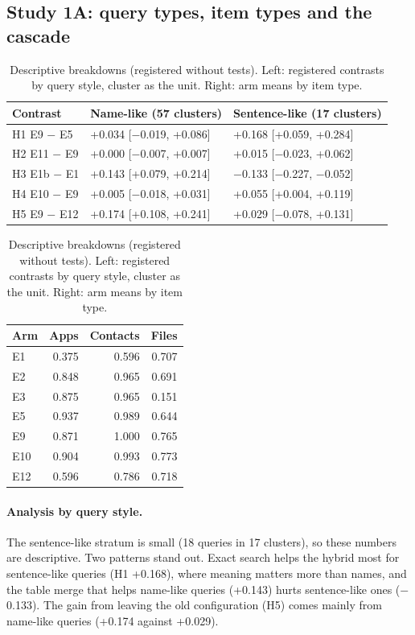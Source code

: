 \documentclass[pdflatex,sn-basic,Numbered]{sn-jnl}
\begin{document}
\subsection{Study 1A: query types, item types and the cascade}\label{sec:s1strata}

\begin{table}[tbp]
\centering\footnotesize\setlength{\tabcolsep}{3pt}
\caption{Descriptive breakdowns (registered without tests). Left: registered contrasts by query style, cluster as the unit. Right: arm means by item type.}
\label{tab:strata}
\begin{tabular}{lll}
\toprule
Contrast & Name-like (57 clusters) & Sentence-like (17 clusters) \\
\midrule
H1 E9 $-$ E5 & +0.034 [$-$0.019, +0.086] & +0.168 [+0.059, +0.284] \\
H2 E11 $-$ E9 & +0.000 [$-$0.007, +0.007] & +0.015 [$-$0.023, +0.062] \\
H3 E1b $-$ E1 & +0.143 [+0.079, +0.214] & $-$0.133 [$-$0.227, $-$0.052] \\
H4 E10 $-$ E9 & +0.005 [$-$0.018, +0.031] & +0.055 [+0.004, +0.119] \\
H5 E9 $-$ E12 & +0.174 [+0.108, +0.241] & +0.029 [$-$0.078, +0.131] \\
\bottomrule
\end{tabular}\hfill
\begin{tabular}{lrrr}
\toprule
Arm & Apps & Contacts & Files \\
\midrule
E1 & 0.375 & 0.596 & 0.707 \\
E2 & 0.848 & 0.965 & 0.691 \\
E3 & 0.875 & 0.965 & 0.151 \\
E5 & 0.937 & 0.989 & 0.644 \\
E9 & 0.871 & 1.000 & 0.765 \\
E10 & 0.904 & 0.993 & 0.773 \\
E12 & 0.596 & 0.786 & 0.718 \\
\bottomrule
\end{tabular}
\end{table}

\paragraph{Analysis by query style.} The sentence-like stratum is small (18 queries in 17 clusters), so these numbers are descriptive. Two patterns stand out. Exact search helps the hybrid most for sentence-like queries (H1 +0.168), where meaning matters more than names, and the table merge that helps name-like queries (+0.143) hurts sentence-like ones ($-$0.133). The gain from leaving the old configuration (H5) comes mainly from name-like queries (+0.174 against +0.029).
\end{document}
